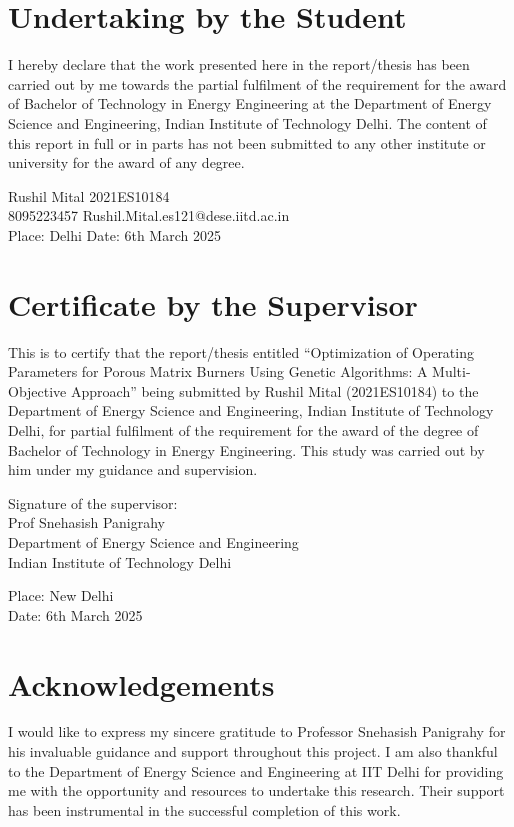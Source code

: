 \documentclass[12pt]{report}
\begin{document}
\newpage

\section*{ \centering Undertaking by the Student}
I hereby declare that the work presented here in the report/thesis has been carried out by me towards the partial fulfilment of the requirement for the award of Bachelor of Technology in Energy Engineering at the Department of Energy Science and Engineering, Indian Institute of Technology Delhi. The content of this report in full or in parts has not been submitted to any other institute or university for the award of any degree.
\vspace{2cm}


Rushil Mital \hfill 2021ES10184 \\
8095223457 \hfill Rushil.Mital.es121@dese.iitd.ac.in \\
Place: Delhi \hfill Date: 6th March 2025

\newpage

\section*{\centering Certificate by the Supervisor}
This is to certify that the report/thesis entitled “Optimization of Operating Parameters for Porous Matrix Burners Using Genetic Algorithms: A Multi-Objective Approach” being submitted by Rushil Mital (2021ES10184) to the Department of Energy Science and Engineering, Indian Institute of Technology Delhi, for partial fulfilment of the requirement for the award of the degree of Bachelor of Technology in Energy Engineering. This study was carried out by him under my guidance and supervision.

\vspace{1cm}

\begin{flushright}
Signature of the supervisor: \\
Prof Snehasish Panigrahy \\
Department of Energy Science and Engineering \\
Indian Institute of Technology Delhi
\end{flushright}

Place: New Delhi \\
Date: 6th March 2025\\



\newpage
\section*{\centering Acknowledgements}
I would like to express my sincere gratitude to Professor Snehasish Panigrahy for his invaluable guidance and support throughout this project. I am also thankful to the Department of Energy Science and Engineering at IIT Delhi for providing me with the opportunity and resources to undertake this research. Their support has been instrumental in the successful completion of this work.
\end{document}
